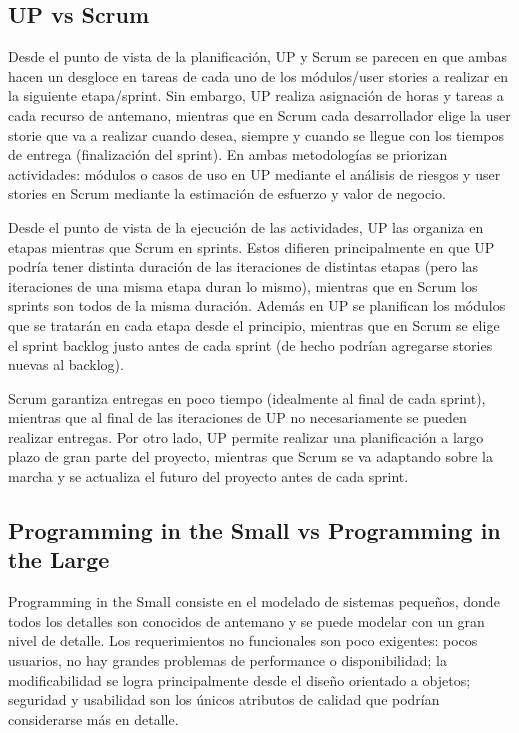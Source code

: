 \subsection{UP vs Scrum}
Desde el punto de vista de la planificación, UP y Scrum se parecen en que ambas hacen un desgloce en tareas de cada uno de los módulos/user stories a realizar en la siguiente etapa/sprint. Sin embargo, UP realiza asignación de horas y tareas a cada recurso de antemano, mientras que en Scrum cada desarrollador elige la user storie que va a realizar cuando desea, siempre y cuando se llegue con los tiempos de entrega (finalización del sprint). En ambas metodologías se priorizan actividades: módulos o casos de uso en UP mediante el análisis de riesgos y user stories en Scrum mediante la estimación de esfuerzo y valor de negocio.

Desde el punto de vista de la ejecución de las actividades, UP las organiza en etapas mientras que Scrum en sprints. Estos difieren principalmente en que UP podría tener distinta duración de las iteraciones de distintas etapas (pero las iteraciones de una misma etapa duran lo mismo), mientras que en Scrum los sprints son todos de la misma duración. Además en UP se planifican los módulos que se tratarán en cada etapa desde el principio, mientras que en Scrum se elige el sprint backlog justo antes de cada sprint (de hecho podrían agregarse stories nuevas al backlog).

Scrum garantiza entregas en poco tiempo (idealmente al final de cada sprint), mientras que al final de las iteraciones de UP no necesariamente se pueden realizar entregas. Por otro lado, UP permite realizar una planificación a largo plazo de gran parte del proyecto, mientras que Scrum se va adaptando sobre la marcha y se actualiza el futuro del proyecto antes de cada sprint.


\subsection{Programming in the Small vs Programming in the Large}
Programming in the Small consiste en el modelado de sistemas pequeños, donde todos los detalles son conocidos de antemano y se puede modelar con un gran nivel de detalle. Los requerimientos no funcionales son poco exigentes: pocos usuarios, no hay grandes problemas de performance o disponibilidad; la modificabilidad se logra principalmente desde el diseño orientado a objetos; seguridad y usabilidad son los únicos atributos de calidad que podrían considerarse más en detalle.

